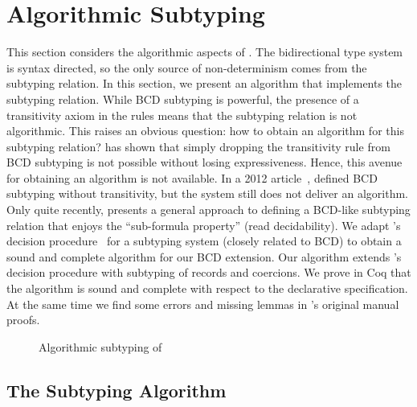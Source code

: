 
\section{Algorithmic Subtyping}
\label{sec:alg}

This section considers the algorithmic aspects of \namee. The bidirectional type
system is syntax directed, so the only source of non-determinism comes from the
subtyping relation. In this section, we present an algorithm that implements the
subtyping relation. While BCD subtyping is powerful, the presence of a
transitivity axiom in the rules means that the subtyping relation is not algorithmic. This
raises an obvious question: how to obtain an algorithm for this subtyping
relation? \citet{Laurent12note} has shown that simply dropping the transitivity
rule from BCD subtyping is not possible without losing expressiveness. Hence,
this avenue for obtaining an algorithm is not available. In a 2012
article~\citep{laurent2012intersection}, \citeauthor{laurent2012intersection}
defined BCD subtyping without transitivity, but the system still does not
deliver an algorithm. Only quite recently, \citet{Laurent18b} presents a general
approach to defining a BCD-like subtyping relation that enjoys the
``sub-formula property'' (read decidability).
We adapt \citeauthor{pierce1989decision}'s decision
procedure~\citep{pierce1989decision} for a subtyping system (closely related to
BCD) to obtain a sound and complete algorithm for our BCD extension. Our
algorithm extends \citeauthor{pierce1989decision}'s decision procedure with
subtyping of records and coercions. We prove in Coq that the algorithm
is sound and complete with respect to the declarative specification. At the same time
we find some errors and missing lemmas in \citeauthor{pierce1989decision}'s
original manual proofs.



\begin{figure}[t]
  \centering
  \caption{Algorithmic subtyping of \namee}
  \label{fig:algorithm}
\end{figure}


\subsection{The Subtyping Algorithm}

